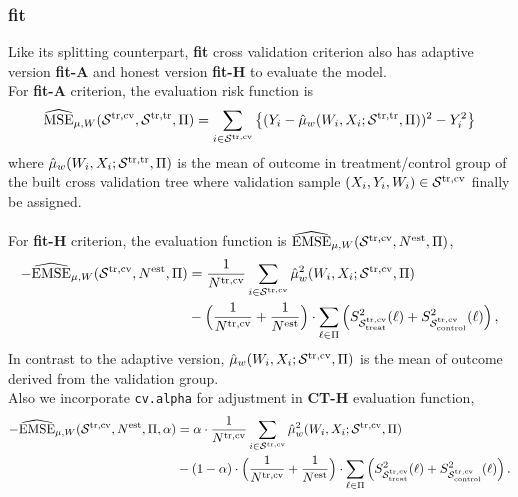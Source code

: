 \documentclass[11pt]{article}
\newcommand{\emse}{{\rm EMSE}}
\newcommand{\est}{{\rm est}}
\newcommand{\calp}{{\Pi}}
\newcommand{\cals}{{\cal S}}
\newcommand{\mse}{{\rm MSE}}
\newcommand{\control}{{\rm control}}
\newcommand{\treat}{{\rm treat}}
\newcommand{\train}{{\rm tr}}
\newcommand{\tcv}{{\rm cv}}
\begin{document}
\subsubsection{fit}
Like its splitting counterpart, \textbf{fit} cross validation criterion also has adaptive version \textbf{fit-A} and honest version \textbf{fit-H} to evaluate the model.\\
For \textbf{fit-A} criterion, the evaluation risk function is  
\[\widehat{\mse}_{\mu, W}(\cals^{\train, \tcv},\cals^{\train, \train},\calp) =  \sum_{i\in\cals^{\train, \tcv}} \left\{(Y_i-\hat\mu_w(W_i,X_i;\cals^{\train, \train},\calp))^2-Y^2_i\right\}\]
where $\hat\mu_w(W_i,X_i;\cals^{\train, \train},\calp)$ is the mean of outcome in treatment/control group of the built cross validation tree where validation sample $(X_i, Y_i, W_i) \in \cals^{\train, \tcv}$ finally be assigned.\\
\\
For \textbf{fit-H} criterion, the evaluation function is $\widehat{\emse}_{\mu, W}(\cals^{\train, \tcv}, N^\est, \calp)$,
\begin{align*}
-\widehat{\emse}_{\mu, W}(\cals^{\train, \tcv}, N^\est, \calp) & = 
\frac{1}{N^{\train, \tcv}}\sum_{i\in\cals^{\train, \tcv}} \hat\mu_w^2(W_i,X_i;\cals^{\train, \tcv},\calp) \\
& -
\Bigl(\frac{1}{N^{\train, \tcv}} + \frac{1}{N^\est}\Bigr)\cdot \sum_{\ell\in\calp}
\left( S^2_{\cals^{\train, \tcv}_\treat}(\ell)+ S^2_{\cals^{\train, \tcv}_\control}(\ell)\right),
\end{align*}
In contrast to the adaptive version, $\hat\mu_w(W_i,X_i;\cals^{\train, \tcv},\calp)$ is the mean of outcome derived from the validation group.\\
Also we incorporate \texttt{cv.alpha} for adjustment in \textbf{CT-H} evaluation function,
\begin{align*}
-\widehat{\emse}_{\mu, W}(\cals^{\train, \tcv}, N^\est, \calp, \alpha) & = 
\alpha \cdot \frac{1}{N^{\train, \tcv}}\sum_{i\in\cals^{\train, \tcv}} \hat\mu_w^2(W_i,X_i;\cals^{\train, \tcv},\calp) \\
& - (1 - \alpha) \cdot
\Bigl(\frac{1}{N^{\train, \tcv}} + \frac{1}{N^\est}\Bigr)\cdot \sum_{\ell\in\calp}
\left( S^2_{\cals^{\train, \tcv}_\treat}(\ell)+ S^2_{\cals^{\train, \tcv}_\control}(\ell)\right).
\end{align*}
\end{document}
